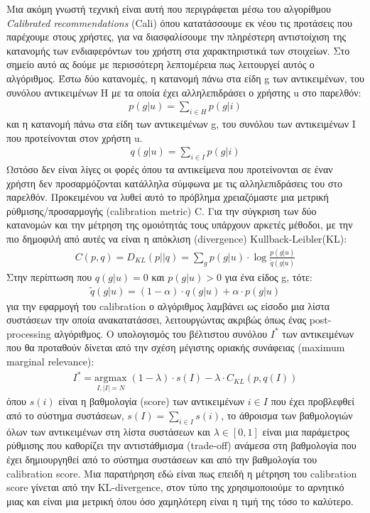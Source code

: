Μια ακόμη γνωστή τεχνική είναι αυτή που περιγράφεται μέσω του αλγορίθμου\textit{ Calibrated recommendations} (Cali) \cite{steckCalibratedRecommendations2018}
όπου κατατάσσουμε εκ νέου τις προτάσεις που παρέχουμε στους χρήστες, για να διασφαλίσουμε την πληρέστερη αντιστοίχιση της κατανομής των ενδιαφερόντων του χρήστη στα χαρακτηριστικά των στοιχείων. Στο σημείο αυτό ας δούμε με περισσότερη λεπτομέρεια πως λειτουργεί αυτός ο αλγόριθμος. Έστω δύο κατανομές, η κατανομή πάνω στα είδη g των αντικειμένων, του συνόλου αντικειμένων H με τα οποία έχει αλληλεπιδράσει ο χρήστης u στο παρελθόν:
\begin{align}
	p(g|u) = \sum_{i \in H} p(g|i)
\end{align}
και η κατανομή πάνω στα είδη των αντικειμένων g, του συνόλου των αντικειμένων I που προτείνονται στον χρήστη u.
\begin{align}
	q(g|u) = \sum_{i \in I} p(g|i)
\end{align}
Ωστόσο δεν είναι λίγες οι φορές όπου τα αντικείμενα που προτείνονται σε έναν χρήστη δεν προσαρμόζονται κατάλληλα σύμφωνα με τις αλληλεπιδράσεις του στο παρελθόν. Προκειμένου να λυθεί αυτό το πρόβλημα χρειαζόμαστε μια μετρική ρύθμισης/προσαρμογής (calibration metric) C. Για την σύγκριση των δύο κατανομών και την μέτρηση της ομοιότητάς τους υπάρχουν αρκετές μέθοδοι, με την πιο δημοφιλή από αυτές να είναι η απόκλιση (divergence) Kullback-Leibler(KL):
\begin{align}
	C(p,q) = D_{KL}(p || q) = \sum_{g} p(g|u) \cdot \log \frac{p(g|u)}{\tilde{q}(g|u)}
\end{align}
Στην περίπτωση που $ q(g|u) = 0 $ και $ p(g|u) > 0 $ για ένα είδος g, τότε:
\begin{align}
	\tilde{q}(g|u) = (1 - \alpha) \cdot q(g|u) + \alpha \cdot p(g|u)
\end{align}
για την εφαρμογή του calibration ο αλγόριθμος λαμβάνει ως είσοδο μια λίστα συστάσεων την οποία ανακατατάσσει, λειτουργώντας ακριβώς όπως ένας post-processing αλγόριθμος. Ο υπολογισμός του βέλτιστου συνόλου $ I^* $ των αντικειμένων που θα προταθούν δίνεται από την σχέση μέγιστης οριακής συνάφειας (maximum marginal relevance):
\begin{align}
	I^* = \underset{I, |I|=N}{\text{argmax}} \; (1 - \lambda) \cdot s(I) - \lambda \cdot C_{KL}(p, q(I))
\end{align}
όπου $ s(i) $ είναι η βαθμολογία (score) των αντικειμένων $ i \in I $ που έχει προβλεφθεί από το σύστημα συστάσεων, $ s(I) = \sum_{i \in I} s(i) $, το άθροισμα των βαθμολογιών όλων των αντικειμένων στη λίστα συστάσεων και $ \lambda \in [0, 1] $ είναι μια παράμετρος ρύθμισης που καθορίζει την αντιστάθμισμα (trade-off) ανάμεσα στη βαθμολογία που έχει δημιουργηθεί από το σύστημα συστάσεων και από την βαθμολογία του calibration score. Μια παρατήρηση εδώ είναι πως επειδή η μέτρηση του calibration score γίνεται από την KL-divergence, στον τύπο της χρησιμοποιούμε το αρνητικό μιας και είναι μια μετρική όπου όσο χαμηλότερη είναι η τιμή της τόσο το καλύτερο.
